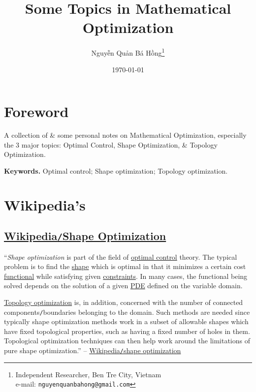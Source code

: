 \documentclass[oneside]{book}
\title{Some Topics in Mathematical Optimization}
\author{\selectlanguage{vietnamese} Nguyễn Quản Bá Hồng\footnote{Independent Researcher, Ben Tre City, Vietnam\\e-mail: \texttt{nguyenquanbahong@gmail.com}}}
\date{\today}
\numberwithin{equation}{section}
\begin{document}
\maketitle
\setcounter{tocdepth}{3}
\setcounter{secnumdepth}{3}
\tableofcontents

\chapter*{Foreword}

A collection of \& some personal notes on Mathematical Optimization, especially the 3 major topics: Optimal Control, Shape Optimization, \& Topology Optimization.

\textbf{Keywords.} Optimal control; Shape optimization; Topology optimization.


\chapter{Wikipedia's}

\section{\href{https://en.wikipedia.org/wiki/Shape_optimization}{Wikipedia\texttt{/}Shape Optimization}}
``\textit{Shape optimization} is part of the field of \href{https://en.wikipedia.org/wiki/Optimal_control}{optimal control} theory. The typical problem is to find the \href{https://en.wikipedia.org/wiki/Shape}{shape} which is optimal in that it minimizes a certain cost \href{https://en.wikipedia.org/wiki/Functional_(mathematics)}{functional} while satisfying given \href{https://en.wikipedia.org/wiki/Constraint_(mathematics)}{constraints}. In many cases, the functional being solved depends on the solution of a given \href{https://en.wikipedia.org/wiki/Partial_differential_equation}{PDE} defined on the variable domain.

\href{https://en.wikipedia.org/wiki/Topology_optimization}{Topology optimization} is, in addition, concerned with the number of connected components\texttt{/}boundaries belonging to the domain. Such methods are needed since typically shape optimization methods work in a subset of allowable shapes which have fixed topological properties, such as having a fixed number of holes in them. Topological optimization techniques can then help work around the limitations of pure shape optimization.'' -- \href{https://en.wikipedia.org/wiki/Shape_optimization}{Wikipedia\texttt{/}shape optimization}
\end{document}
